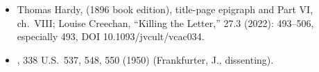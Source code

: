 {\begin{itemize}[itemsep=0em,topsep=0.15em,parsep=0pt]
John M. Darley and C. Daniel Batson, ``From Jerusalem to Jericho,''
 27.1 (1973): 100--108.
\item Thomas Hardy, 
(1896 book edition), title-page epigraph and Part VI, ch.~VIII; Louise
Creechan, ``Killing the Letter,''  27.3
(2022): 493--506, especially 493, DOI 10.1093/jvcult/vcac034.
\item {}, 338 U.S.~537,
548, 550 (1950) (Frankfurter, J., dissenting).
\end{itemize}}
